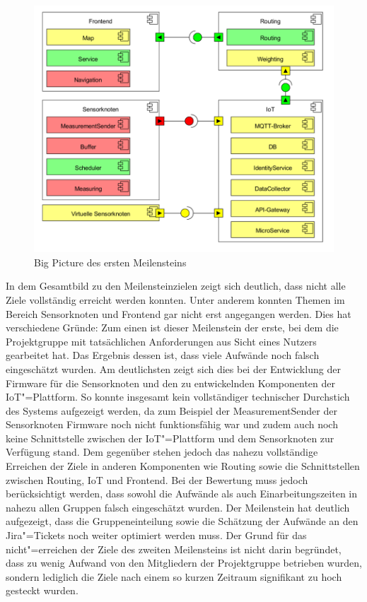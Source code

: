 \begin{figure}[!htb]
	\centering
	\includegraphics[width=\textwidth]{./ressourcen/bigpicture1.png}
	\caption{Big Picture des ersten Meilensteins}
	\label{fig:bigpicture1}
\end{figure}

In dem Gesamtbild zu den Meilensteinzielen zeigt sich deutlich, dass nicht alle Ziele vollständig erreicht werden konnten.
Unter anderem konnten Themen im Bereich Sensorknoten und Frontend gar nicht erst angegangen werden.
Dies hat verschiedene Gründe: Zum einen ist dieser Meilenstein der erste, bei dem die Projektgruppe mit tatsächlichen Anforderungen aus Sicht eines Nutzers gearbeitet hat.
Das Ergebnis dessen ist, dass viele Aufwände noch falsch eingeschätzt wurden.
Am deutlichsten zeigt sich dies bei der Entwicklung der Firmware für die Sensorknoten und den zu entwickelnden Komponenten der IoT"=Plattform.
So konnte insgesamt kein vollständiger technischer Durchstich des Systems aufgezeigt werden, da zum Beispiel der MeasurementSender der Sensorknoten Firmware noch nicht funktionsfähig war und zudem auch noch keine Schnittstelle zwischen der IoT"=Plattform und dem Sensorknoten zur Verfügung stand.
Dem gegenüber stehen jedoch das nahezu vollständige Erreichen der Ziele in anderen Komponenten wie Routing sowie die Schnittstellen zwischen Routing, IoT und Frontend.
Bei der Bewertung muss jedoch berücksichtigt werden, dass sowohl die Aufwände als auch Einarbeitungszeiten in nahezu allen Gruppen falsch eingeschätzt wurden.
Der Meilenstein hat deutlich aufgezeigt, dass die Gruppeneinteilung sowie die Schätzung der Aufwände an den Jira"=Tickets noch weiter optimiert werden muss.
Der Grund für das nicht"=erreichen der Ziele des zweiten Meilensteins ist nicht darin begründet, dass zu wenig Aufwand von den Mitgliedern der Projektgruppe betrieben wurden, sondern lediglich die Ziele nach einem so kurzen Zeitraum signifikant zu hoch gesteckt wurden.